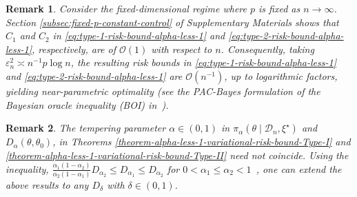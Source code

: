 \documentclass[12pt]{article}
\newtheorem{remark}{Remark}[section]
\numberwithin{equation}{section}
\begin{document}
\begin{remark}
\label{remark:near-minimaxity}
Consider the fixed-dimensional regime where $p$ is fixed as $n\to \infty$. Section \ref{subsec:fixed-p-constant-control} of Supplementary Materials shows that $C_1$ and $C_2$ in \eqref{eq:type-1-risk-bound-alpha-less-1} and \eqref{eq:type-2-risk-bound-alpha-less-1}, respectively, are of $\mathcal{O}(1)$ with respect to $n$. Consequently, taking $\varepsilon^{2}_{n} \asymp n^{-1} p \log n$, the resulting risk bounds in \eqref{eq:type-1-risk-bound-alpha-less-1} and \eqref{eq:type-2-risk-bound-alpha-less-1} are $\mathcal{O}(n^{-1})$, up to logarithmic factors, yielding near-parametric optimality (see the PAC-Bayes formulation of the Bayesian oracle inequality (BOI) in~\cite{Bayesian-fractional-posterior}).
\end{remark}

\begin{remark}
\label{remark:alpha-dependence}
The tempering parameter $\alpha\in (0, 1)$ in  $\pi_{\alpha}(\theta \mid \mathcal{D}_n, \xi^{\star})$ and $D_{\alpha}(\theta, \theta_0)$, in Theorems \ref{theorem-alpha-less-1-variational-risk-bound-Type-I} and \ref{theorem-alpha-less-1-variational-risk-bound-Type-II} need not coincide. Using the inequality, $\tfrac{\alpha_1(1-\alpha_2)}{\alpha_2(1-\alpha_1)} D_{\alpha_2} \le D_{\alpha_1} \le D_{\alpha_2}$ for $0 < \alpha_1 \le \alpha_2 < 1$~\citep{van2014renyi}, one can extend the above results to any $D_{\delta}$ with $\delta \in (0, 1)$.
\end{remark}
\end{document}
